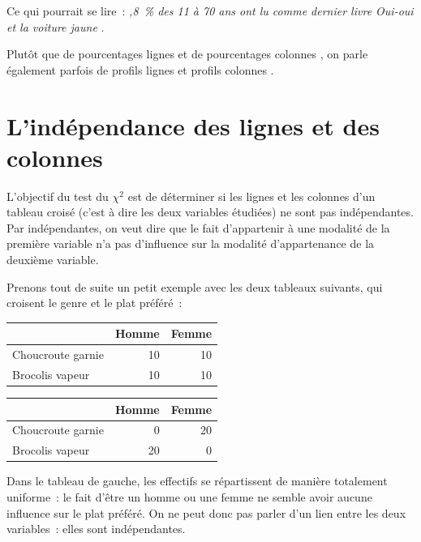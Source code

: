 \documentclass[a4paper,10pt,twoside,francais]{report}
\newcommand{\chid}{$\chi^2$\xspace}
\begin{document}
Ce qui pourrait se lire~: \textit{,8~\% des 11 à 70 ans ont lu
  comme dernier livre \textrm{Oui-oui et la voiture jaune} \fg{}}.

Plutôt que de \og pourcentages lignes \fg{} et de \og pourcentages
colonnes \fg{}, on parle également parfois de \og profils lignes \fg{}
et \og profils colonnes \fg{}.


\section{L'indépendance des lignes et des colonnes}
\label{ssec-hypindep}

L'objectif du test du \chid est de déterminer si les lignes et les
colonnes d'un tableau croisé (c'est à dire les deux variables
étudiées) ne sont pas indépendantes. Par indépendantes, on veut dire
que le fait d'appartenir à une modalité de la première variable n'a
pas d'influence sur la modalité d'appartenance de la deuxième
variable.

Prenons tout de suite un petit exemple avec les deux tableaux
suivants, qui croisent le genre et le plat préféré~:

\begin{center}
  \hfill
  \begin{minipage}[c]{.46\linewidth}
    \begin{tabular}[!h]{lrr}
      \toprule
      & Homme & Femme \\
      \midrule
      Choucroute garnie & 10 & 10 \\
      Brocolis vapeur & 10 & 10 \\
      \bottomrule
    \end{tabular}
  \end{minipage} 
  \hfill
  \begin{minipage}[c]{.46\linewidth}
    \begin{tabular}[!h]{lrr}
      \toprule
      & Homme & Femme \\
      \midrule
      Choucroute garnie & 0 & 20 \\
      Brocolis vapeur &  20 & 0 \\
      \bottomrule
    \end{tabular}
  \end{minipage}
  \hfill
\end{center}

Dans le tableau de gauche, les effectifs se répartissent de manière
totalement uniforme~: le fait d'être un homme ou une femme ne semble
avoir aucune influence sur le plat préféré. On ne peut donc pas parler
d'un lien entre les deux variables~: elles sont indépendantes.
\end{document}
